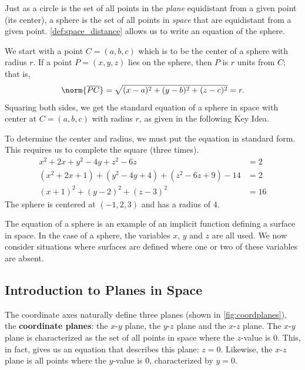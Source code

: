 Just as a circle is the set of all points in the \textit{plane} equidistant from a given point (its center), a sphere is the set of all points in \textit{space} that are equidistant from a given point. \autoref{def:space_distance} allows us to write an equation of the sphere.

We start with a point $C = (a,b,c)$ which is to be the center of a sphere with radius $r$. If a point $P=(x,y,z)$ lies on the sphere, then $P$ is $r$ units from $C$; that is, 
\[\norm{\overline{PC}}= \sqrt{(x-a)^2+(y-b)^2+(z-c)^2} = r.\]
Squaring both sides, we get the standard equation of a sphere in space with center at $C=(a,b,c)$ with radius $r$, as given in the following Key Idea.



{To determine the center and radius, we must put the equation in standard form. This requires us to complete the square (three times).
\begin{align*}
x^2+2x+y^2-4y+z^2-6z&=2 \\
(x^2+2x+1) + (y^2-4y+4)+ (z^2-6z+9) - 14 &= 2\\
(x+1)^2 + (y-2)^2 + (z-3)^2 &= 16
\end{align*}
The sphere is centered at $(-1,2,3)$ and has a radius of 4.}

The equation of a sphere is an example of an implicit function defining a surface in space. In the case of a sphere, the variables $x$, $y$ and $z$ are all used. We now consider situations where surfaces are defined where one or two of these variables are absent.

\subsection*{Introduction to Planes in Space}

The coordinate axes naturally define three planes (shown in \autoref{fig:coordplanes}), the \textbf{coordinate planes}: the $x$-$y$ plane, the $y$-$z$ plane and the $x$-$z$ plane. The $x$-$y$ plane is characterized as the set of all points in space where the $z$-value is 0. %
This, in fact, gives us an equation that describes this plane: $z=0$. Likewise, the $x$-$z$ plane is all points where the $y$-value is 0, characterized by $y=0$.\\


